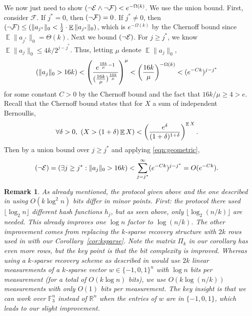 \documentclass[11pt]{article}
\newtheorem{remark}{Remark}
\DeclareMathOperator*{\E}{\mathbb{E}}
\let\Pr\relax
\DeclareMathOperator*{\Pr}{\mathbb{P}}
\newcommand{\R}{\mathbb{R}}
\newcommand{\F}{\mathbb{F}}
\begin{document}
We now just need to show $\Pr(\neg\mathcal{E} \wedge \neg\mathcal{F}) < e^{-\Omega(k)}$. We use the union bound. First, consider $\mathcal{F}$. If $j^* = 0$, then $\Pr(\neg\mathcal{F}) = 0$. If $j^*\neq 0$, then $\Pr(\neg\mathcal{F}) \le \Pr(\|a_{j^*}\|_0 < \frac 12 \cdot\E\|a_{j^*}\|_0)$, which is $e^{-\Omega(k)}$ by the Chernoff bound since $\E\|a_{j^*}\|_0 = \Theta(k)$. Next we bound $\Pr(\neg \mathcal{E})$. For $j\ge j^*$, we know $\E\|a_j\|_0 \le 4k/2^{j-j^*}$. Thus, letting $\mu$ denote $\E\|a_j\|_0$, 
\begin{equation}
\Pr(\|a_j\|_0 > 16k) < \left(\frac{e^{\frac{16k}{\mu} - 1}}{(\frac{16k}{\mu})^{\frac{16k}{\mu}}}\right)^\mu < \left(\frac{16k}{\mu}\right)^{-\Omega(k)} < (e^{-Ck})^{j-j^*}\label{eqn:geometric}
\end{equation}
for some constant $C>0$ by the Chernoff bound and the fact that $16k/\mu \ge 4 > e$. Recall that the Chernoff bound states that for $X$ a sum of independent Bernoullis,
$$
\forall \delta > 0,\ \Pr(X > (1+\delta) \E X) < \left(\frac{e^\delta}{(1+\delta)^{1+\delta}}\right)^{\E X} .
$$
Then by a union bound over $j\ge j^*$ and applying \eqref{eqn:geometric},
$$
\Pr(\neg \mathcal{E}) = \Pr(\exists j\ge j^*: \|a_j\|_0 > 16k) < \sum_{j=j^*}^\infty (e^{-Ck})^{j-j^*} = O(e^{-Ck}) .
$$

\begin{remark}\label{rem:recov}
\textup{
As already mentioned, the protocol given above and the one described in \cite{JowhariST11} using $O(k\log^2 n)$ bits differ in minor points. First: the protocol there used $\lfloor\log_2 n\rfloor$ different hash functions $h_j$, but as seen above, only $\lfloor \log_2(n/k)\rfloor$ are needed. This already improves one $\log n$ factor to $\log(n/k)$. The other improvement comes from replacing the $k$-sparse recovery structure with $2k$ rows used in \cite{JowhariST11} with our Corollary~\ref{cor:ksparse}. Note the matrix $\Pi_k$ in our corollary has even {\it more} rows, but the key point is that the bit complexity is improved. Whereas using a $k$-sparse recovery scheme as described in \cite{JowhariST11} would use $2k$ linear measurements of a $k$-sparse vector $w\in\{-1,0,1\}^n$ with $\log n$ bits per measurement (for a total of $O(k\log n)$ bits), we use $O(k\log(n/k))$ measurements with only $O(1)$ bits per measurement. The key insight is that we can work over $\F_3^n$ instead of $\R^n$ when the entries of $w$ are in $\{-1,0,1\}$, which leads to our slight improvement.
}
\end{remark}
\end{document}
